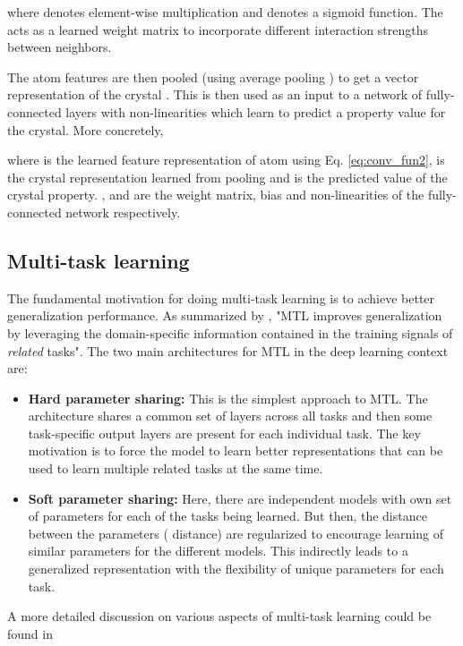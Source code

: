 \documentclass{article}
\begin{document}
where  denotes element-wise multiplication and  denotes a sigmoid function. The  acts as a learned weight matrix to incorporate different interaction strengths between neighbors.

The atom features are then pooled (using average pooling \citep{DuvenaudMAGHAA15}) to get a vector representation of the crystal . This is then used as an input to a network of fully-connected layers with non-linearities which learn to predict a property value for the crystal. More concretely,


where  is the learned feature representation of  atom using Eq. \ref{eq:conv_fun2},  is the crystal representation learned from pooling and  is the predicted value of the crystal property. ,  and  are the weight matrix, bias and non-linearities of the fully-connected network respectively.

\subsection{Multi-task learning}
\label{sec:mtl_background}
The fundamental motivation for doing multi-task learning is to achieve better generalization performance. As summarized by \citep{Caruana1997}, "MTL improves generalization by leveraging the domain-specific information contained in the training signals of \textit{related} tasks". The two main architectures for MTL in the deep learning context \citep{Ruder17a} are:

\begin{itemize}
\item \textbf{Hard parameter sharing:} This is the simplest approach to MTL. The architecture shares a common set of layers across all tasks and then some task-specific output layers are present for each individual task. The key motivation is to force the model to learn better representations that can be used to learn multiple related tasks at the same time.

\item \textbf{Soft parameter sharing:} Here, there are independent models with own set of parameters for each of the tasks being learned. But then, the distance between the parameters ( distance) are regularized to encourage learning of similar parameters for the different models. This indirectly leads to a generalized representation with the flexibility of unique parameters for each task.
\end{itemize}

A more detailed discussion on various aspects of multi-task learning could be found in \citep{Caruana1997, Ruder17a}
\end{document}
